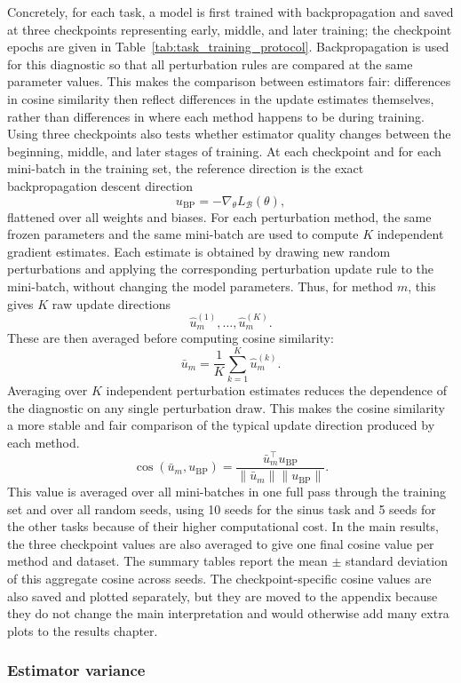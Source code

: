 Concretely, for each task, a model is first trained with backpropagation and saved at three checkpoints representing early, middle, and later training; the checkpoint epochs are given in Table~\ref{tab:task_training_protocol}. Backpropagation is used for this diagnostic so that all perturbation rules are compared at the same parameter values. This makes the comparison between estimators fair: differences in cosine similarity then reflect differences in the update estimates themselves, rather than differences in where each method happens to be during training. Using three checkpoints also tests whether estimator quality changes between the beginning, middle, and later stages of training. At each checkpoint and for each mini-batch in the training set, the reference direction is the exact backpropagation descent direction
\[
    u_{\mathrm{BP}}
    =
    -\nabla_\theta L_{\mathcal{B}}(\theta),
\]
flattened over all weights and biases. For each perturbation method, the same frozen parameters and the same mini-batch are used to compute \(K\) independent gradient estimates. Each estimate is obtained by drawing new random perturbations and applying the corresponding perturbation update rule to the mini-batch, without changing the model parameters. Thus, for method \(m\), this gives \(K\) raw update directions
\[
    \widehat{u}^{(1)}_m,\ldots,\widehat{u}^{(K)}_m .
\]
These are then averaged before computing cosine similarity:
\[
    \bar{u}_m
    =
    \frac{1}{K}
    \sum_{k=1}^{K}
    \widehat{u}^{(k)}_m.
\]
Averaging over \(K\) independent perturbation estimates reduces the dependence of the diagnostic on any single perturbation draw. This makes the cosine similarity a more stable and fair comparison of the typical update direction produced by each method.
\[
    \cos(\bar{u}_m,u_{\mathrm{BP}})
    =
    \frac{\bar{u}_m^\top u_{\mathrm{BP}}}
    {\|\bar{u}_m\|\|u_{\mathrm{BP}}\|}.
\]
This value is averaged over all mini-batches in one full pass through the training set and over all random seeds, using 10 seeds for the sinus task and 5 seeds for the other tasks because of their higher computational cost. In the main results, the three checkpoint values are also averaged to give one final cosine value per method and dataset. The summary tables report the mean \(\pm\) standard deviation of this aggregate cosine across seeds. The checkpoint-specific cosine values are also saved and plotted separately, but they are moved to the appendix because they do not change the main interpretation and would otherwise add many extra plots to the results chapter.
\subsubsection{Estimator variance}

